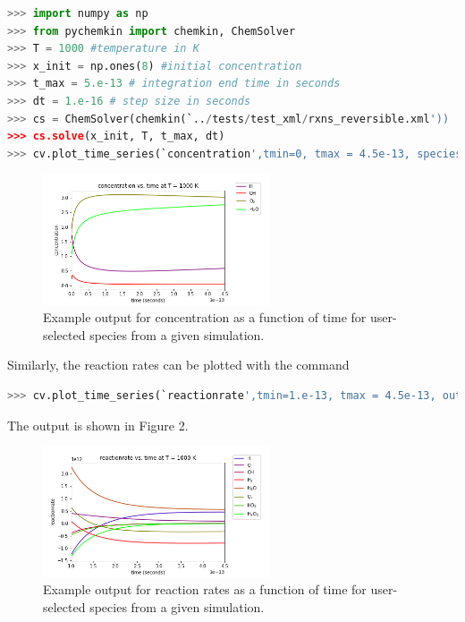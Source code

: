 \documentclass[12pt]{article}
\begin{document}
\begin{lstlisting}[language = Python, basicstyle = \ttfamily,columns = fullflexible, showstringspaces = False]
>>> import numpy as np
>>> from pychemkin import chemkin, ChemSolver
>>> T = 1000 #temperature in K
>>> x_init = np.ones(8) #initial concentration
>>> t_max = 5.e-13 # integration end time in seconds
>>> dt = 1.e-16 # step size in seconds
>>> cs = ChemSolver(chemkin(`../tests/test_xml/rxns_reversible.xml'))
>>> cs.solve(x_init, T, t_max, dt)
>>> cv.plot_time_series(`concentration',tmin=0, tmax = 4.5e-13, species = [`H', `OH', `O2', `H2O'],outputfile = `modeldocfig1.png')
\end{lstlisting}

\begin{figure}[h!]
  \caption{Example output for concentration as a function of time for user-selected species from a given simulation.}
  \centering
  \includegraphics[width=0.6\textwidth]{../examples/modeldocfig1.png}
\end{figure}

Similarly, the reaction rates can be plotted with the command \\

\begin{lstlisting}[language = Python, basicstyle = \ttfamily,columns = fullflexible, showstringspaces = False]
>>> cv.plot_time_series(`reactionrate',tmin=1.e-13, tmax = 4.5e-13, outputfile = `modeldocfig2.png')
\end{lstlisting}
The output is shown in Figure 2. 




\begin{figure}[h!]
  \caption{Example output for reaction rates as a function of time for user-selected species from a given simulation.}
  \centering
  \includegraphics[width=0.6\textwidth]{../examples/modeldocfig2.png}
\end{figure}
\end{document}
